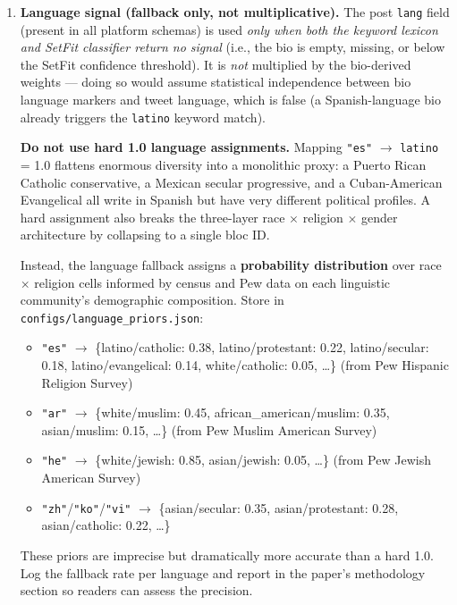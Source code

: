 \documentclass[11pt]{article}
\begin{document}
\begin{enumerate}[leftmargin=2em, itemsep=3pt]
  \item \textbf{Language signal (fallback only, not multiplicative).} The post
        \texttt{lang} field (present in all platform schemas) is used \emph{only when both the keyword lexicon and
        SetFit classifier return no signal} (i.e., the bio is empty, missing, or
        below the SetFit confidence threshold). It is \emph{not} multiplied by
        the bio-derived weights --- doing so would assume statistical independence
        between bio language markers and tweet language, which is false (a
        Spanish-language bio already triggers the \texttt{latino} keyword match).

        \begin{mdframed}[style=warnbox]
        \textbf{Do not use hard 1.0 language assignments.}
        Mapping \texttt{"es"} $\to$ \texttt{latino} = 1.0 flattens enormous
        diversity into a monolithic proxy: a Puerto Rican Catholic conservative,
        a Mexican secular progressive, and a Cuban-American Evangelical all write
        in Spanish but have very different political profiles. A hard assignment
        also breaks the three-layer race $\times$ religion $\times$ gender
        architecture by collapsing to a single bloc ID.

        Instead, the language fallback assigns a \textbf{probability distribution}
        over race $\times$ religion cells informed by census and Pew data on each
        linguistic community's demographic composition. Store in
        \texttt{configs/language\_priors.json}:
        \begin{itemize}[leftmargin=1.4em, itemsep=1pt]
          \item \texttt{"es"} $\to$ \{latino/catholic: 0.38, latino/protestant: 0.22,
                latino/secular: 0.18, latino/evangelical: 0.14, white/catholic: 0.05,
                \ldots\} (from Pew Hispanic Religion Survey)
          \item \texttt{"ar"} $\to$ \{white/muslim: 0.45, african\_american/muslim: 0.35,
                asian/muslim: 0.15, \ldots\} (from Pew Muslim American Survey)
          \item \texttt{"he"} $\to$ \{white/jewish: 0.85, asian/jewish: 0.05,
                \ldots\} (from Pew Jewish American Survey)
          \item \texttt{"zh"}/\texttt{"ko"}/\texttt{"vi"} $\to$ \{asian/secular: 0.35,
                asian/protestant: 0.28, asian/catholic: 0.22, \ldots\}
        \end{itemize}
        These priors are imprecise but dramatically more accurate than a hard 1.0.
        Log the fallback rate per language and report in the paper's methodology
        section so readers can assess the precision.
        \end{mdframed}


\end{enumerate}
\end{document}
